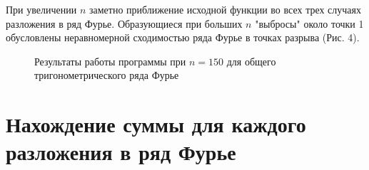 \documentclass[a5paper, 10pt]{article}
\theoremstyle{definition}
\theoremstyle{plain}
\theoremstyle{remark}
\begin{document}
При увеличении $n$ заметно приближение исходной функции во всех трех случаях разложения в ряд Фурье. Образующиеся при больших $n$ "выбросы"  около точки 1 обусловлены неравномерной сходимостью ряда Фурье в точках разрыва (Рис. 4).


\begin{figure}[h]
	           \caption{Результаты работы программы при $n = 150$ для общего тригонометрического ряда Фурье}
		
\label{ris:5}
\end{figure}


\newpage

\section{Нахождение суммы для каждого разложения в ряд Фурье}
\end{document}
